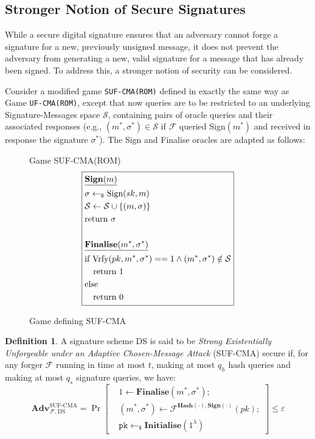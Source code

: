 \documentclass[]{final_report}
\theoremstyle{definition}
\newtheorem{definition}{Definition}[chapter]
\begin{document}
\subsection{Stronger Notion of Secure Signatures}
While a secure digital signature ensures that an adversary cannot forge a signature for a new, previously unsigned message, it does not prevent the adversary from generating a new, valid signature for a message that has already been signed. To address this, a stronger notion of security can be considered.

Consider a modified game \texttt{SUF-CMA(ROM)} defined in exactly the same way as Game \texttt{UF-CMA(ROM)}, except that  now queries are to be restricted to an underlying Signature-Messages space $\mathcal{S}$, containing pairs of oracle queries and their associated responses (e.g., $(m^*, \sigma^*) \in \mathcal{S}$ if  $\mathcal{F}$ queried Sign$(m^*)$ and received in response the signature $\sigma^*$). The Sign and Finalise oracles are adapted as follows:
\begin{figure}[H]
\centering
\hfill Game SUF-CMA(ROM)\hfill\phantom{} 
\[
\boxed{
\begin{aligned}
&\underline{\textbf{\text{Sign}}(m)} \\
&\sigma \leftarrow_{\$} \text{Sign}(sk, m) \\
&\mathcal{S} \leftarrow \mathcal{S} \cup\{(m, \sigma)\} \\
&\text{return } \sigma \\
\\
&\underline{\textbf{\text{Finalise}}(m^*, \sigma^*)} \\
&\text{if Vrfy}(pk, m^*, \sigma^*) == 1 \land (m^*, \sigma^*) \notin \mathcal{S} \\
&\quad \text{return } 1 \\
&\text{else} \\
&\quad \text{return } 0
\end{aligned}
}
\]
\caption{Game defining SUF-CMA}
\label{fig:crypto_game}
\end{figure} 
\begin{definition}
A signature scheme DS is said to be \emph{Strong Existentially Unforgeable under an Adaptive Chosen-Message Attack} (SUF-CMA) secure if, for any forger \(\mathcal{F}\) running in time at most \(t\), making at most \(q_h\) hash queries and making at most \(q_s\) signature queries, we have:
\[
\textbf{Adv}_{\mathcal{F},\text{DS}}^{\text{SUF-CMA}} = \Pr \left[ \begin{aligned} &1 \leftarrow \textbf{Finalise}(m^*, \sigma^*); \\ &(m^*, \sigma^*) \leftarrow \mathcal{F}^{\textbf{Hash}(\cdot),\textbf{Sign}(\cdot)}(pk); \\ &\texttt{pk} \leftarrow_{\$} \textbf{Initialise}(1^{\lambda}) \end{aligned} \right] \leq \varepsilon
\]
\end{definition}
\end{document}
